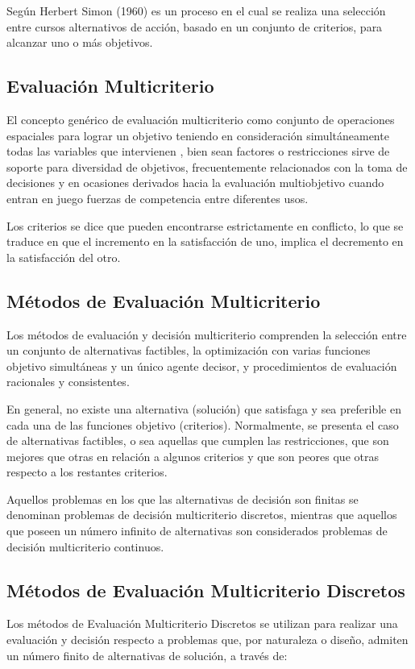 Seg\'un Herbert Simon (1960) es un proceso en el cual se realiza una selecci\'on entre cursos alternativos de acci\'on, basado en un conjunto de criterios, para alcanzar uno o m\'as objetivos. \cite{Herbert1960}

\subsection{Evaluaci\'on Multicriterio}
El concepto gen\'erico de evaluaci\'on multicriterio como conjunto de operaciones espaciales para lograr un objetivo teniendo en consideraci\'on simult\'aneamente todas las variables que intervienen \cite{Barredo1996}, bien sean factores o restricciones \cite{S.Mass1995} sirve de soporte para diversidad de objetivos, frecuentemente relacionados con la toma de decisiones y en ocasiones derivados hacia la evaluaci\'on multiobjetivo cuando entran en juego fuerzas de competencia entre diferentes usos. \cite{Moreno1991}

Los criterios se dice que pueden encontrarse estrictamente en conflicto, lo que se traduce en que el incremento en la satisfacci\'on de uno, implica el decremento en la satisfacci\'on del otro.\cite{Hurtado2005}

\subsection{M\'etodos  de Evaluaci\'on Multicriterio}
Los m\'etodos de evaluaci\'on y decisi\'on multicriterio comprenden la selecci\'on entre un conjunto de alternativas factibles, la optimizaci\'on con varias funciones objetivo simult\'aneas y un \'unico agente decisor, y procedimientos de evaluaci\'on racionales y consistentes.

En general, no existe una alternativa (soluci\'on) que satisfaga y sea preferible en cada una de las funciones objetivo (criterios). Normalmente, se presenta el caso de alternativas factibles, o sea aquellas que cumplen las restricciones, que son mejores que otras en relaci\'on a algunos criterios y que son peores que otras respecto a los restantes criterios.\cite{MauricioEscudey(eds.)1997}

Aquellos problemas en los que las alternativas de decisi\'on son finitas se denominan problemas de decisi\'on multicriterio discretos, mientras que aquellos que poseen un n\'umero infinito de alternativas son considerados problemas de decisi\'on multicriterio continuos.\cite{Hurtado2005}

\subsection{M\'etodos de Evaluaci\'on Multicriterio Discretos}
Los m\'etodos de Evaluaci\'on Multicriterio Discretos se utilizan para realizar una evaluaci\'on y decisi\'on respecto a problemas que, por naturaleza o dise\~no, admiten un n\'umero finito de alternativas de soluci\'on, a trav\'es de:


